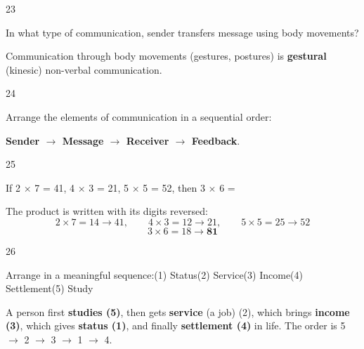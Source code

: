 \begin{question}{23}
{In what type of communication, sender transfers message using body movements?\par}
\begin{explain}
Communication through body movements (gestures, postures) is \textbf{gestural} (kinesic) non-verbal communication.
\end{explain}
\end{question}

\begin{question}{24}
{Arrange the elements of communication in a sequential order:\par}
\begin{explain}
\textbf{Sender $\rightarrow$ Message $\rightarrow$ Receiver $\rightarrow$ Feedback}.
\end{explain}
\end{question}

\begin{question}{25}
{If 2 $\times$ 7 = 41, 4 $\times$ 3 = 21, 5 $\times$ 5 = 52, then 3 $\times$ 6 = \blank{}\par}
\begin{explain}
The product is written with its digits reversed:
\[2\times7=14\rightarrow41,\qquad4\times3=12\rightarrow21,\qquad5\times5=25\rightarrow52\]
\[3\times6=18\rightarrow\mathbf{81}\]
\end{explain}
\end{question}

\begin{question}{26}
{Arrange in a meaningful sequence:\newline (1) Status\newline (2) Service\newline (3) Income\newline (4) Settlement\newline (5) Study\par}
\begin{explain}
A person first \textbf{studies (5)}, then gets \textbf{service} (a job) (2), which brings \textbf{income (3)}, which gives \textbf{status (1)}, and finally \textbf{settlement (4)} in life. The order is 5 $\rightarrow$ 2 $\rightarrow$ 3 $\rightarrow$ 1 $\rightarrow$ 4.
\end{explain}
\end{question}

